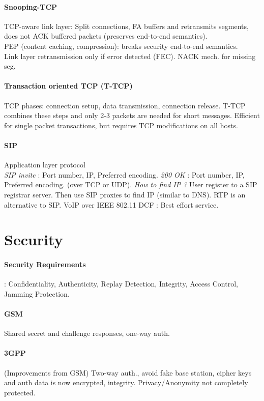 \documentclass[6pt]{scrartcl}
\begin{document}
\begin{multicols}{4}
\paragraph{Snooping-TCP} TCP-aware link layer: Split connections, FA buffers and retransmits segments, does not ACK buffered packets (preserves end-to-end semantics).
\\PEP (content caching, compression): breaks security end-to-end semantics.\\ Link layer retransmission only if error detected (FEC). NACK mech. for missing seg.
\paragraph{Transaction oriented TCP (T-TCP)} TCP phases: connection setup, data transmission, connection release. T-TCP combines these steps and only 2-3 packets are needed for short messages. Efficient for single packet transactions, but requires TCP modifications on all hosts.
\paragraph{SIP} Application layer protocol\\
\emph{SIP invite} : Port number, IP, Preferred encoding. \emph{200 OK} : Port number, IP, Preferred encoding. (over TCP or UDP). \emph{How to find IP ?} User register to a SIP registrar server. Then use SIP proxies to find IP (similar to DNS). RTP is an alternative to SIP. VoIP over IEEE 802.11 DCF : Best effort service.





\section{Security}
\paragraph{Security Requirements}: Confidentiality, Authenticity, Replay Detection, Integrity, Access Control, Jamming Protection.
\paragraph{GSM} Shared secret and challenge responses, one-way auth.
\paragraph{3GPP} (Improvements from GSM) Two-way auth., avoid fake base station, cipher keys and auth data is now encrypted, integrity. Privacy/Anonymity not completely protected.


\end{multicols}
\end{document}
